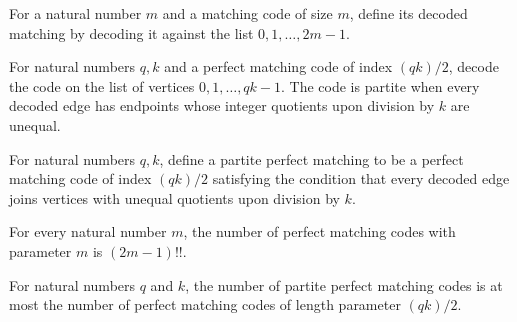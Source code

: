 \begin{definition}
\label{FABL.decodedPerfectMatching}
\leanok
{}
For a natural number $m$ and a matching code of size $m$, define its decoded matching by
decoding it against the list $0,1,\ldots,2m-1$.
\end{definition}

\begin{definition}
\label{FABL.IsPartitePerfectMatchingCode}
\leanok
{}
For natural numbers $q,k$ and a perfect matching code of index $(qk)/2$, decode the code
on the list of vertices $0,1,\ldots,qk-1$. The code is partite when every decoded edge
has endpoints whose integer quotients upon division by $k$ are unequal.
\end{definition}

\begin{definition}
\label{FABL.PartitePerfectMatching}
\leanok
{}
For natural numbers $q,k$, define a partite perfect matching to be a perfect matching
code of index $(qk)/2$ satisfying the condition that every decoded edge joins vertices
with unequal quotients upon division by $k$.
\end{definition}

\begin{theorem}
\label{FABL.natCard_perfectMatchingCode}
\leanok
{}
For every natural number $m$, the number of perfect matching codes with parameter $m$ is
$(2m-1)!!$.
\end{theorem}

\begin{theorem}
\label{FABL.natCard_partitePerfectMatching_le_code}
\leanok
{}
For natural numbers $q$ and $k$, the number of partite perfect matching codes is at most
the number of perfect matching codes of length parameter $(qk)/2$.
\end{theorem}

